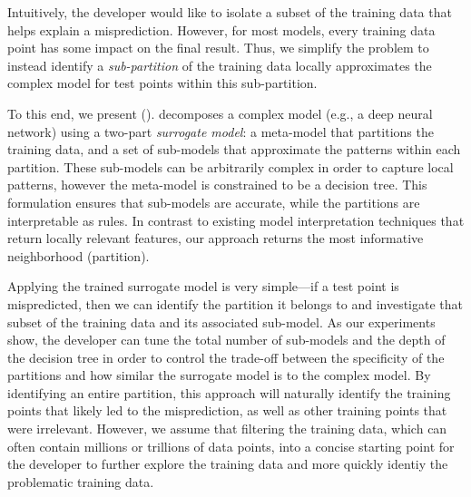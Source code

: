 

Intuitively, the developer would like to isolate a subset of the training data that helps explain a misprediction. 
However, for most models, every training data point has some impact on the final result.
Thus, we simplify the problem to instead identify a {\it sub-partition} of the training data locally approximates the complex model for test points within this sub-partition.  


To this end, we present \sysfull (\sys).   \sys decomposes a complex model (e.g., a deep neural network) using a two-part {\it surrogate model}: a meta-model that partitions the training data, and a set of sub-models that approximate the patterns within each partition.
These sub-models can be arbitrarily complex in order to capture local patterns, however the meta-model is constrained to be a decision tree.
This formulation ensures that sub-models are accurate, while the partitions are interpretable as rules.
In contrast to existing model interpretation techniques that return locally relevant features, our approach returns the most informative neighborhood (partition).

Applying the trained surrogate model is very simple---if a test point is mispredicted, then we can identify the partition it belongs to and investigate that subset of the training data and its associated sub-model.
As our experiments show, the developer can tune the total number of sub-models and the depth of the decision tree in order to control the trade-off between the specificity of the partitions and how similar the surrogate model is to the complex model.
By identifying an entire partition, this approach will naturally identify the training points that likely led to the misprediction, as well as other training points that were irrelevant.   However, we assume that filtering the training data, which can often contain millions or trillions of data points, into a concise starting point for the developer to further explore the training data and more quickly identiy the problematic training data.

